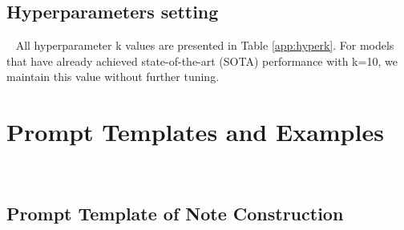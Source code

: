 \documentclass{article}
\begin{document}
\subsection{Hyperparameters setting}~\label{app:sec:hyper}
All hyperparameter k values are presented in Table \ref{app:hyperk}. For models that have already achieved state-of-the-art (SOTA) performance with k=10, we maintain this value without further tuning.

\begin{table}[tb!]
\caption{Selection of k values in retriever across specific categories and model choices.}
\label{app:hyperk}
    \centering
\end{table}

\clearpage

\section{Prompt Templates and Examples}~\label{app:sec:prompt}
\subsection{Prompt Template of Note Construction}
\end{document}
